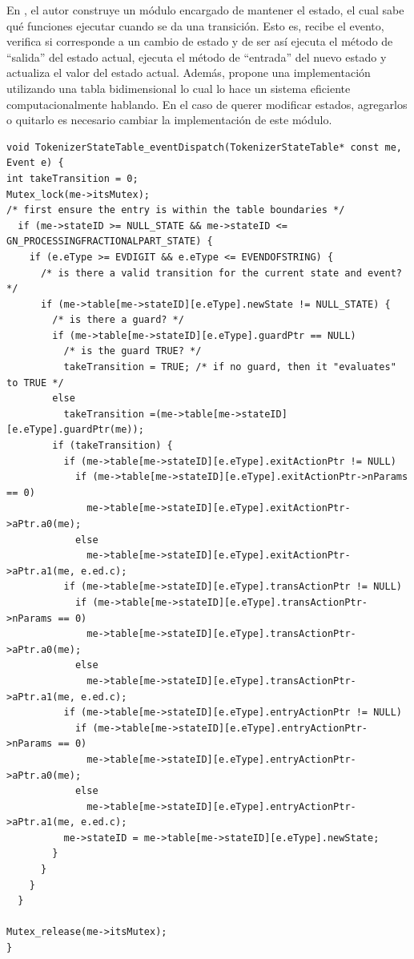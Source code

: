 En \cite{douglass}, el autor construye un módulo encargado de mantener el estado, el cual sabe qué funciones ejecutar cuando se da una transición. Esto es, recibe el evento, verifica si corresponde a un cambio de estado y de ser así ejecuta el método de ``salida'' del estado actual, ejecuta el método de ``entrada'' del nuevo estado y actualiza el valor del estado actual. Además, propone una implementación utilizando una tabla bidimensional lo cual lo hace un sistema eficiente computacionalmente hablando. En el caso de querer modificar estados, agregarlos o quitarlo es necesario cambiar la implementación de este módulo. 

\begin{lstlisting}[caption=Código ejemplo extraído de libro de Douglass State Table Pág. 305., label={ifsanidados}]
void TokenizerStateTable_eventDispatch(TokenizerStateTable* const me, Event e) {
int takeTransition = 0;
Mutex_lock(me->itsMutex);
/* first ensure the entry is within the table boundaries */
  if (me->stateID >= NULL_STATE && me->stateID <= GN_PROCESSINGFRACTIONALPART_STATE) {
    if (e.eType >= EVDIGIT && e.eType <= EVENDOFSTRING) {
      /* is there a valid transition for the current state and event? */
      if (me->table[me->stateID][e.eType].newState != NULL_STATE) {
        /* is there a guard? */
        if (me->table[me->stateID][e.eType].guardPtr == NULL)
          /* is the guard TRUE? */
          takeTransition = TRUE; /* if no guard, then it "evaluates" to TRUE */
        else
          takeTransition =(me->table[me->stateID][e.eType].guardPtr(me));
        if (takeTransition) {
          if (me->table[me->stateID][e.eType].exitActionPtr != NULL)
            if (me->table[me->stateID][e.eType].exitActionPtr->nParams == 0)
              me->table[me->stateID][e.eType].exitActionPtr->aPtr.a0(me);
            else
              me->table[me->stateID][e.eType].exitActionPtr->aPtr.a1(me, e.ed.c);
          if (me->table[me->stateID][e.eType].transActionPtr != NULL)
            if (me->table[me->stateID][e.eType].transActionPtr->nParams == 0)
              me->table[me->stateID][e.eType].transActionPtr->aPtr.a0(me);
            else
              me->table[me->stateID][e.eType].transActionPtr->aPtr.a1(me, e.ed.c);
          if (me->table[me->stateID][e.eType].entryActionPtr != NULL)
            if (me->table[me->stateID][e.eType].entryActionPtr->nParams == 0)
              me->table[me->stateID][e.eType].entryActionPtr->aPtr.a0(me);
            else
              me->table[me->stateID][e.eType].entryActionPtr->aPtr.a1(me, e.ed.c);
          me->stateID = me->table[me->stateID][e.eType].newState;
        }
      }
    }
  }

Mutex_release(me->itsMutex);
}
\end{lstlisting}


